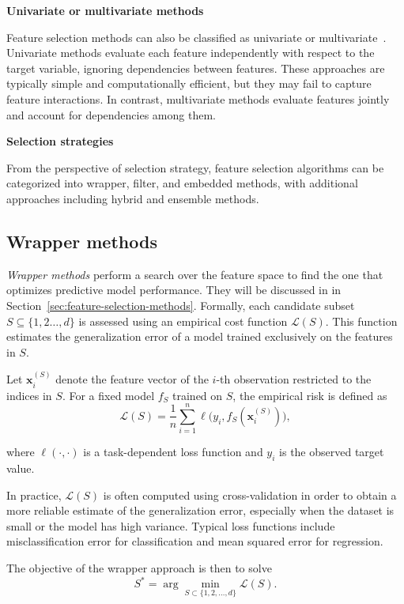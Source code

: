 \textbf{Univariate or multivariate methods} 

Feature selection methods can also be classified as univariate or multivariate~\cite{lazar2012}. Univariate methods evaluate each feature independently with respect to the target variable, ignoring dependencies between features. These approaches are typically simple and computationally efficient, but they may fail to capture feature interactions. In contrast, multivariate methods evaluate features jointly and account for dependencies among them.

\textbf{Selection strategies} 

From the perspective of selection strategy, feature selection algorithms can be categorized into wrapper, filter, and embedded methods, with additional approaches including hybrid and ensemble methods.

\subsection{Wrapper methods} 
\emph{Wrapper methods} perform a search over the feature space to find the one that optimizes predictive model performance. They will be discussed in in Section~\ref{sec:feature-selection-methods}. Formally, each candidate subset $S\subseteq \{1,2 \dots, d\}$ is assessed using an empirical cost function \(\mathcal{L}(S)\). This function estimates the generalization error of a model trained exclusively on the features in $S$.

Let $\mathbf{x}_i^{(S)}$ denote the feature vector of the $i$-th observation restricted to the indices in $S$. For a fixed model $f_S$ trained on $S$, the empirical risk is defined as
\begin{equation}
\mathcal{L}(S) = \frac{1}{n} \sum_{i=1}^{n} \ell\bigl(y_i, f_S(\mathbf{x}_i^{(S)})\bigr),
\end{equation}

where $\ell(\cdot,\cdot)$ is a task-dependent loss function and $y_i$ is the observed target value.

In practice, $\mathcal{L}(S)$ is often computed using cross-validation in order to obtain \break a more reliable estimate of the generalization error, especially when the dataset is small or the model has high variance. Typical loss functions include misclassification error for classification and mean squared error for regression.

The objective of the wrapper approach is then to solve
\begin{equation}
S^* = \arg\min_{S \subset \{1,2,\dots,d\}} \mathcal{L}(S).
\end{equation}

